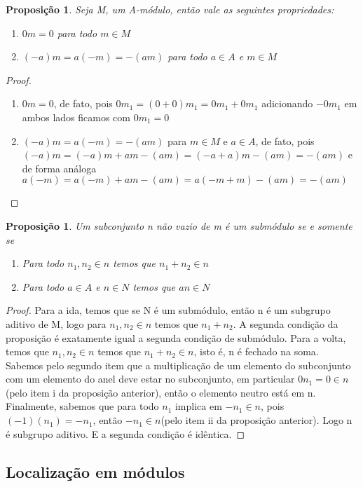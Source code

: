 \documentclass[10pt,a4paper]{article}
\newtheorem{proposition}[theorem]{Proposição}
\begin{document}
\begin{proposition}
	Seja M, um A-módulo, então vale as seguintes propriedades:
	\begin{enumerate}
		\item $0m=0$ para todo $m \in M$
		\item $(-a)m=a(-m)=-(am)$ para todo $a \in A$ e $m \in M$
	\end{enumerate}
\end{proposition}

\begin{proof}
	\begin{enumerate}
		\item $0m=0$, de fato, pois $0m_1=(0+0)m_1=0m_1+0m_1$ adicionando $-0m_1$ em ambos lados ficamos com $0m_1=0$
		\item $(-a)m=a(-m)=-(am)$ para $m \in M$ e $a \in A$, de fato, pois $(-a)m=(-a)m+am-(am)=(-a+a)m-(am)=-(am)$ e de forma análoga $a(-m)=a(-m)+am-(am)=a(-m+m)-(am)=-(am)$
	\end{enumerate}
\end{proof}

\begin{proposition}
	Um subconjunto n não vazio de m é um submódulo se e somente se
	\begin{enumerate}
		\item Para todo $n_1, n_2 \in n$ temos que $n_1+n_2 \in n$
		\item Para todo $a \in A$ e $n \in N$ temos que $an \in N$
	\end{enumerate}
\end{proposition}
\begin{proof}
	Para a ida, temos que se N é um submódulo, então n é um subgrupo aditivo de M, logo para $n_1, n_2 \in n$ temos que $n_1+n_2$. A segunda condição da proposição é exatamente igual a segunda condição de submódulo.
	Para a volta, temos que  $n_1, n_2 \in n$ temos que $n_1+n_2 \in n$, isto é, n é fechado na soma. Sabemos pelo segundo item que a multiplicação de um elemento do subconjunto com um elemento do anel deve estar no subconjunto, em particular $0 n_1 = 0 \in n$(pelo item i da proposição anterior), então o elemento neutro está em n. Finalmente, sabemos que para todo $n_1$ implica em $-n_1 \in n$, pois $(-1)(n_1)=-n_1$, então $-n_1 \in n$(pelo item ii da proposição anterior). Logo n é subgrupo aditivo. E a segunda condição é idêntica.
\end{proof}


\subsection{Localização em módulos}
\end{document}
